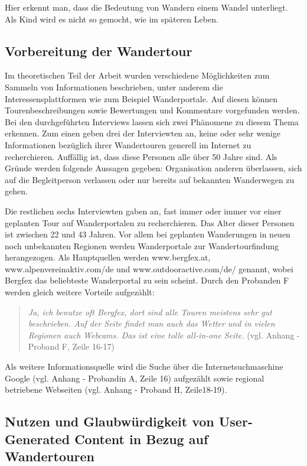 Hier erkennt man, dass die Bedeutung von Wandern einem Wandel unterliegt. Als Kind wird es nicht so gemocht, wie im späteren Leben.

\subsection{Vorbereitung der Wandertour}

Im theoretischen Teil der Arbeit wurden verschiedene Möglichkeiten zum Sammeln von Informationen beschrieben, unter anderem die Interessensplattformen wie zum Beispiel Wanderportale. Auf diesen können Tourenbeschreibungen sowie Bewertungen und Kommentare vorgefunden werden. Bei den durchgeführten Interviews lassen sich zwei Phänomene zu diesem Thema erkennen. Zum einen geben drei der Interviewten an, keine oder sehr wenige Informationen bezüglich ihrer Wandertouren generell im Internet zu recherchieren. Auffällig ist, dass diese Personen alle über 50 Jahre sind. Als Gründe werden folgende Aussagen gegeben: Organisation anderen überlassen, sich auf die Begleitperson verlassen oder nur bereits auf bekannten Wanderwegen zu gehen.

Die restlichen sechs Interviewten gaben an, fast immer oder immer vor einer geplanten Tour auf Wanderportalen zu recherchieren. Das Alter dieser Personen ist zwischen 22 und 43 Jahren. Vor allem bei geplanten Wanderungen in neuen noch unbekannten Regionen werden Wanderportale zur Wandertourfindung herangezogen. Als Hauptquellen werden www.bergfex.at, www.alpenvereinaktiv.com/de und www.outdooractive.com/de/ genannt, wobei Bergfex das beliebteste Wanderportal zu sein scheint. 
Durch den Probanden F werden gleich weitere Vorteile aufgezählt:

\begin{quote}
	\textit{\glqq Ja, ich benutze oft Bergfex, dort sind alle Touren meistens sehr gut beschrieben. Auf der Seite findet man auch das Wetter und in vielen Regionen auch Webcams. Das ist eine tolle all-in-one Seite.\grqq} (vgl. Anhang - Proband F, Zeile 16-17)
\end{quote}

Als weitere Informationsquelle wird die Suche über die Internetsuchmaschine Google (vgl. Anhang - Probandin A, Zeile 16) aufgezählt sowie regional betriebene Webseiten (vgl. Anhang - Proband H, Zeile18-19). 

\subsection{Nutzen und Glaubwürdigkeit von User-Generated Content in Bezug auf Wandertouren}


